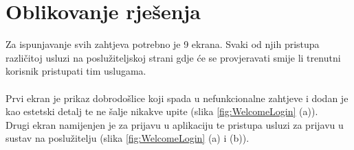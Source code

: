 \documentclass[times, utf8, zavrsni]{fer}
\begin{document}
\chapter{Oblikovanje rješenja}
Za ispunjavanje svih zahtjeva potrebno je 9 ekrana. Svaki od njih pristupa različitoj usluzi na poslužiteljskoj strani gdje
će se provjeravati smije li trenutni korisnik pristupati tim uslugama.\\\\
Prvi ekran je prikaz dobrodošlice koji spada u nefunkcionalne zahtjeve i dodan je kao
estetski detalj te ne šalje nikakve upite (slika \ref*{fig:WelcomeLogin} (a)).\\
Drugi ekran namijenjen je za prijavu u aplikaciju te pristupa usluzi za prijavu u sustav
na poslužitelju (slika \ref*{fig:WelcomeLogin} (a) i (b)).
\begin{figure}[h]
      \centering

\end{figure}
\end{document}
